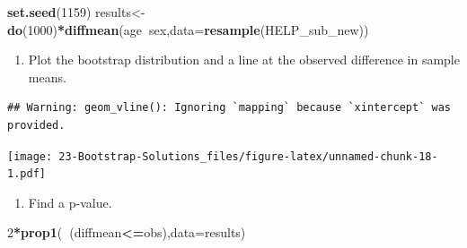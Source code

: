 \documentclass[
]{book}
\newenvironment{Shaded}{\begin{snugshade}}{\end{snugshade}}
\newcommand{\DataTypeTok}[1]{\textcolor[rgb]{0.13,0.29,0.53}{#1}}
\newcommand{\DecValTok}[1]{\textcolor[rgb]{0.00,0.00,0.81}{#1}}
\newcommand{\KeywordTok}[1]{\textcolor[rgb]{0.13,0.29,0.53}{\textbf{#1}}}
\newcommand{\NormalTok}[1]{#1}
\newcommand{\OperatorTok}[1]{\textcolor[rgb]{0.81,0.36,0.00}{\textbf{#1}}}
\newcommand{\StringTok}[1]{\textcolor[rgb]{0.31,0.60,0.02}{#1}}
\providecommand{\tightlist}{%
  \setlength{\itemsep}{0pt}\setlength{\parskip}{0pt}}
\begin{document}
\begin{Shaded}
\begin{Highlighting}[]
\KeywordTok{set.seed}\NormalTok{(}\DecValTok{1159}\NormalTok{)}
\NormalTok{results<-}\KeywordTok{do}\NormalTok{(}\DecValTok{1000}\NormalTok{)}\OperatorTok{*}\KeywordTok{diffmean}\NormalTok{(age}\OperatorTok{~}\NormalTok{sex,}\DataTypeTok{data=}\KeywordTok{resample}\NormalTok{(HELP_sub_new))}
\end{Highlighting}
\end{Shaded}

\begin{enumerate}
\def\labelenumi{\alph{enumi}.}
\setcounter{enumi}{4}
\tightlist
\item
  Plot the bootstrap distribution and a line at the observed difference in sample means.
\end{enumerate}

\begin{Shaded}
\end{Shaded}

\begin{verbatim}
## Warning: geom_vline(): Ignoring `mapping` because `xintercept` was provided.
\end{verbatim}

\texttt{[image: 23-Bootstrap-Solutions\_files/figure-latex/unnamed-chunk-18-1.pdf]}

\begin{enumerate}
\def\labelenumi{\alph{enumi}.}
\setcounter{enumi}{5}
\tightlist
\item
  Find a p-value.
\end{enumerate}

\begin{Shaded}
\begin{Highlighting}[]
\DecValTok{2}\OperatorTok{*}\KeywordTok{prop1}\NormalTok{(}\OperatorTok{~}\NormalTok{(diffmean}\OperatorTok{<=}\NormalTok{obs),}\DataTypeTok{data=}\NormalTok{results)}
\end{Highlighting}
\end{Shaded}
\end{document}
